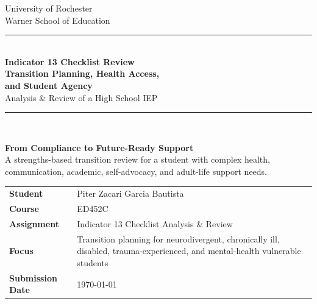 \documentclass[11pt]{article}
\begin{document}
\begin{titlepage}
\thispagestyle{empty}

\begin{center}
{\large University of Rochester\\}
{\normalsize Warner School of Education\\[0.35in]}

{\color{PrimaryRed}\rule{\textwidth}{1.4pt}}\\[0.22in]
{\Huge\bfseries Indicator 13 Checklist Review\\[0.08in]
Transition Planning, Health Access,\\[0.08in]
and Student Agency}\\[0.18in]
{\Large Analysis \& Review of a High School IEP}\\[0.22in]
{\color{PrimaryRed}\rule{0.78\textwidth}{0.7pt}}\\[0.32in]

\colorbox{SoftBlue}{%
\parbox{0.88\textwidth}{%
\centering\vspace{0.12in}
\textbf{From Compliance to Future-Ready Support}\\[0.05in]
A strengths-based transition review for a student with complex health, communication, academic, self-advocacy, and adult-life support needs.
\vspace{0.12in}
}%
}
\end{center}

\vspace{0.38in}

\begin{center}
\renewcommand{\arraystretch}{1.18}
\setlength{\tabcolsep}{4pt}
\begin{tabular}{>{\bfseries\RaggedLeft}p{1.65in} p{4.9in}}
Student & Piter Zacari Garcia Bautista \\
Course & ED452C \\
Assignment & Indicator 13 Checklist Analysis \& Review \\
Focus & Transition planning for neurodivergent, chronically ill, disabled, trauma-experienced, and mental-health vulnerable students \\
Submission Date & \today \\
\end{tabular}
\end{center}

\vspace{0.28in}


\end{titlepage}
\end{document}
